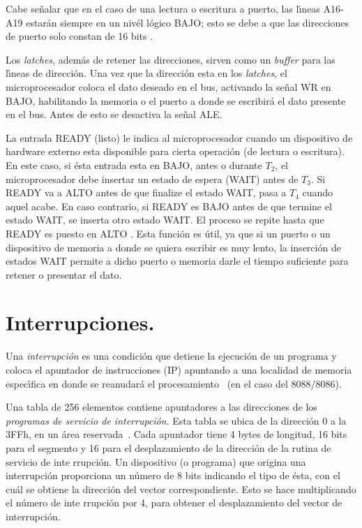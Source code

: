 Cabe se\~nalar que en el caso de una lectura o escritura a puerto, las l\'{\i}neas A16-A19 %
estar\'an siempre en un niv\'el l\'ogico BAJO; esto se debe a que las direcciones de puerto %
solo constan de 16 bits \cite{Hall}.

Los {\em latches\/}, adem\'as de retener las direcciones, sirven como un {\em buffer\/} para %
las l\'{\i}neas de direcci\'on. Una vez que la direcci\'on esta en los {\em latches\/}, el %
microprocesador coloca el dato deseado en el bus, activando la se\~nal %
$\overline{\mbox{WR}}$ en BAJO, habilitando la memoria o el puerto a donde se escribir\'a %
el dato presente en el bus. Antes de esto se desactiva la se\~nal ALE.

La entrada READY (listo) le indica al microprocesador cuando un dispositivo de hardware externo %
esta disponible para cierta operaci\'on (de lectura o escritura). En este caso, si \'esta %
entrada esta en BAJO, antes o durante $T_{2}$, el microprocesador debe insertar un estado de %
espera (WAIT) antes de $T_{3}$. Si READY va a ALTO antes de que finalize el estado WAIT, pasa a %
$T_{4}$ cuando aquel acabe. En caso contrario, si READY es BAJO antes de que termine el estado %
WAIT, se inserta otro estado WAIT. El proceso se repite hasta que READY es puesto en ALTO %
\cite{Hall}. Esta funci\'on es \'util, ya que si un puerto o un dispositivo de memoria a donde %
se quiera escribir es muy lento, la inserci\'on de estados WAIT permite a dicho puerto o memoria %
darle el tiempo suficiente para retener o presentar el dato.


\section{Interrupciones.}
\label{Section:interrupciones}

Una {\em in\-te\-rrup\-ci\-\'on\/} es una condici\'on que detiene la ejecuci\'on de un %
programa y coloca el apuntador de instrucciones (IP) apuntando a una localidad de memoria %
espec\'{\i}fica en donde se reanudar\'a el procesamiento~\cite{Godfrey} (en el caso del %
8088/8086).

Una tabla de 256 elementos contiene apuntadores a las direcciones de los {\em programas de %
servicio de in\-te\-rrup\-ci\-\'on\/}. Esta tabla se ubica de la direcci\'on 0 a la 3FFh, en %
un \'area reservada~\cite{Intel:Micro}. Cada apuntador tiene 4 bytes de longitud, 16 bits para %
el segmento y 16 para el desplazamiento de la direcci\'on de la rutina de servicio de in\-te\-%
rrup\-ci\-\'on. Un dispositivo (o programa) que o\-ri\-gi\-na una in\-te\-rrup\-ci\-\'on %
proporciona un n\'umero de 8 bits indicando el tipo de \'esta, con el cu\'al se obtiene la %
direcci\'on del vector correspondiente. Esto se hace multiplicando el n\'umero de in\-te\-%
rrup\-ci\-\'on por 4, para obtener el desplazamiento del vector de in\-te\-rrup\-ci\-\'on.

